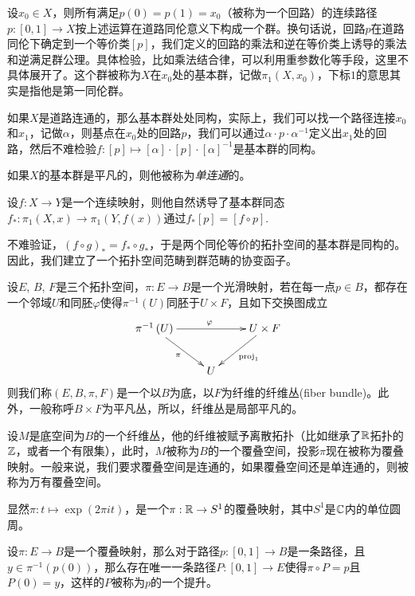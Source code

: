 \para 设$x_0\in X$，则所有满足$p(0)=p(1)=x_0$（被称为一个{\kaishu 回路}）的连续路径$p:[0,1]\to X$按上述运算在道路同伦意义下构成一个群。换句话说，回路$p$在道路同伦下确定到一个等价类$[p]$，我们定义的回路的乘法和逆在等价类上诱导的乘法和逆满足群公理。具体检验，比如乘法结合律，可以利用重参数化等手段，这里不具体展开了。这个群被称为$X$在$x_0$处的{\kaishu 基本群}，记做$\pi_1(X,x_0)$，下标$1$的意思其实是指他是第一同伦群。\endpara

如果$X$是道路连通的，那么基本群处处同构，实际上，我们可以找一个路径连接$x_0$和$x_1$，记做$\alpha$，则基点在$x_0$处的回路$p$，我们可以通过$\alpha \cdot p \cdot \alpha^{-1}$定义出$x_1$处的回路，然后不难检验$f:[p]\mapsto [\alpha] \cdot [p] \cdot [\alpha]^{-1}$是基本群的同构。

如果$X$的基本群是平凡的，则他被称为\textit{单连通}的。

\para 设$f:X\to Y$是一个连续映射，则他自然诱导了基本群同态$f_*:\pi_1(X,x)\to \pi_1(Y,f(x))$通过$f_*[p]=[f\circ p]$. 

不难验证，$(f\circ g)_*=f_*\circ g_*$，于是两个同伦等价的拓扑空间的基本群是同构的。因此，我们建立了一个拓扑空间范畴到群范畴的协变函子。

\endpara

 设$E$, $B$, $F$是三个拓扑空间，$\pi:E\to B$是一个光滑映射，若在每一点$p\in B$，都存在一个邻域$U$和同胚$\varphi$使得$\pi^{-1}(U)$同胚于$U \times F$，且如下交换图成立
\[
	\xymatrix{
		\pi^{-1}\left(U\right)\ar[rr]^\varphi \ar[dr]_\pi&&U\times F \ar[dl]^{\mathrm{proj}_1}\\
		&U&
		}
\]
则我们称$(E, B, \pi, F)$是一个以$B$为底，以$F$为纤维的纤维丛(fiber bundle)。此外，一般称呼$B\times F$为平凡丛，所以，纤维丛是局部平凡的。\endpara

 设$M$是底空间为$B$的一个纤维丛，他的纤维被赋予离散拓扑（比如继承了$\mathbb{R}$拓扑的$\mathbb{Z}$，或者一个有限集），此时，$M$被称为$B$的一个覆叠空间，投影$\pi$现在被称为覆叠映射。一般来说，我们要求覆叠空间是连通的，如果覆叠空间还是单连通的，则被称为万有覆叠空间。\endpara

显然$\pi:t\mapsto \exp(2\pi it)$，是一个$\pi:\mathbb{R} \to S^1$的覆叠映射，其中$S^1$是$\mathbb{C}$内的单位圆周。

\begin{pro}
设$\pi:E\to B$是一个覆叠映射，那么对于路径$p:[0,1]\to B$是一条路径，且$y\in \pi^{-1}(p(0))$，那么存在唯一一条路径$P:[0,1]\to E$使得$\pi\circ P=p$且$P(0)=y$，这样的$P$被称为$p$的一个提升。
\end{pro}

